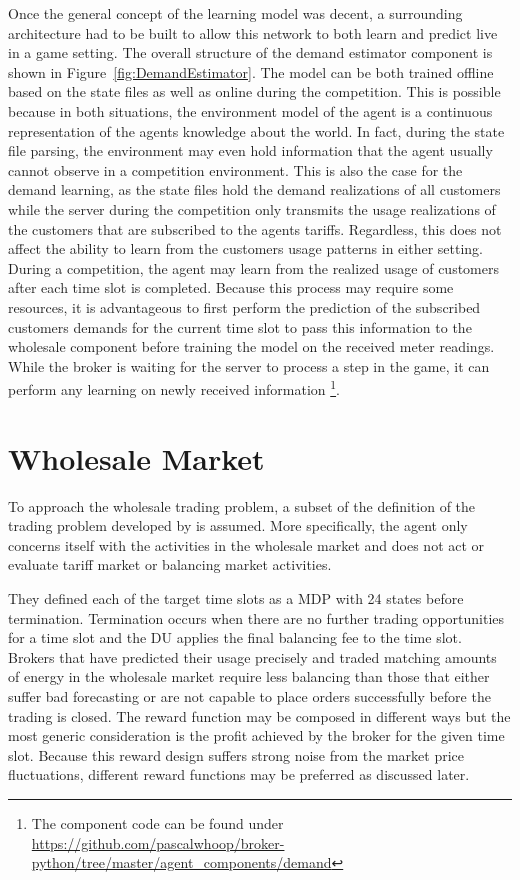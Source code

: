 Once the general concept of the learning model was decent, a surrounding architecture had to be built to allow this
network to both learn and predict live in a game setting.
The overall structure of the demand estimator component is shown in Figure~\ref{fig:DemandEstimator}. The model can be
both trained offline based on the state files as well as online during the competition. This is possible because in both
situations, the environment model of the agent is a continuous representation of the agents knowledge about the world.
In fact, during the state file parsing, the environment may even hold information that the agent usually cannot observe
in a competition environment. This is also the case for the demand learning, as the state files hold the demand
realizations of all customers while the server during the competition only transmits the usage realizations of the
customers that are subscribed to the agents tariffs. Regardless, this does not affect the ability to learn from the
customers usage patterns in either setting. During a competition, the agent may learn from the realized usage of
customers after each time slot is completed. Because this process may require some resources, it is advantageous to
first perform the prediction of the subscribed customers demands for the current time slot to pass this information to
the wholesale component before training the model on the received meter readings. While the broker is waiting for the
server to process a step in the game, it can perform any learning on newly received information \footnote{The component code can be
found under \url{https://github.com/pascalwhoop/broker-python/tree/master/agent_components/demand}}.


\section{Wholesale Market}
\label{sec:wholesale_market}

To approach the wholesale trading problem, a subset of the definition of the trading problem developed by
\citet{tactexurieli2016mdp} is assumed. More specifically, the agent only concerns itself with the activities in the
wholesale market and does not act or evaluate tariff market or balancing market activities.

They defined each of the target time slots as a \ac{MDP} with 24 states before termination. Termination occurs when
there are no further trading opportunities for a time slot and the \ac{DU} applies the final balancing fee to the
time slot. Brokers that have predicted their usage precisely and traded matching amounts of energy in the wholesale
market require less balancing than those that either suffer bad forecasting or are not capable to place orders
successfully before the trading is closed. The reward function may be composed in different ways but the most generic
consideration is the profit achieved by the broker for the given time slot. Because this reward design suffers strong
noise from the market price fluctuations, different reward functions may be preferred as discussed later.

